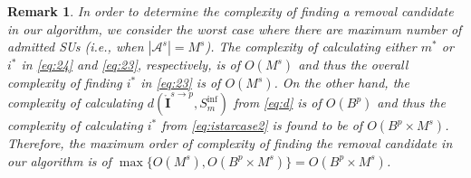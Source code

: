 \documentclass[journal,twoside]{IEEEtran}
\newcommand{\A}{\mathcal{A}}
\newcommand{\CIzerobold}{{\mathring{\mathbf{I}}^{s \rightarrow p}}}
\newtheorem {remark}{Remark}
\begin{document}
	\begin{remark}
		In order to determine the complexity of finding a removal candidate in our algorithm, we consider the worst case where there are maximum number of admitted SUs (i.e., when $|\A^s|=M^s$).
		The complexity of calculating either $m^{*}$ or $i^{*}$ in \eqref{eq:24} and \eqref{eq:23}, respectively, is of $O(M^s)$ and thus the overall complexity of finding $i^{*}$ in \eqref{eq:23} is of $O(M^s)$. On the other hand, the complexity of calculating $d(\CIzerobold,S_m^{\mathrm{inf}})$ from \eqref{eq:d} is of $O(B^p)$ and thus the complexity of calculating $i^{*}$ from \eqref{eq:istarcase2} is found to be of $O(B^p \times M^s)$. Therefore, the maximum order of complexity of finding the removal candidate in our algorithm is of $\max\{O(M^s),O(B^p \times M^s)\}=O(B^p \times M^s)$.
		
	\end{remark}
	
\end{document}
